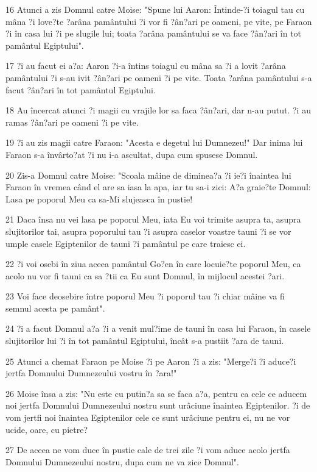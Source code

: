 \par 16 Atunci a zis Domnul catre Moise: "Spune lui Aaron: Întinde-?i toiagul tau cu mâna ?i love?te ?arâna pamântului ?i vor fi ?ân?ari pe oameni, pe vite, pe Faraon ?i în casa lui ?i pe slugile lui; toata ?arâna pamântului se va face ?ân?ari în tot pamântul Egiptului".
\par 17 ?i au facut ei a?a: Aaron ?i-a întins toiagul cu mâna sa ?i a lovit ?arâna pamântului ?i s-au ivit ?ân?ari pe oameni ?i pe vite. Toata ?arâna pamântului s-a facut ?ân?ari în tot pamântul Egiptului.
\par 18 Au încercat atunci ?i magii cu vrajile lor sa faca ?ân?ari, dar n-au putut. ?i au ramas ?ân?ari pe oameni ?i pe vite.
\par 19 ?i au zis magii catre Faraon: "Acesta e degetul lui Dumnezeu!" Dar inima lui Faraon s-a învârto?at ?i nu i-a ascultat, dupa cum spusese Domnul.
\par 20 Zis-a Domnul catre Moise: "Scoala mâine de diminea?a ?i ie?i înaintea lui Faraon în vremea când el are sa iasa la apa, iar tu sa-i zici: A?a graie?te Domnul: Lasa pe poporul Meu ca sa-Mi slujeasca în pustie!
\par 21 Daca însa nu vei lasa pe poporul Meu, iata Eu voi trimite asupra ta, asupra slujitorilor tai, asupra poporului tau ?i asupra caselor voastre tauni ?i se vor umple casele Egiptenilor de tauni ?i pamântul pe care traiesc ei.
\par 22 ?i voi osebi în ziua aceea pamântul Go?en în care locuie?te poporul Meu, ca acolo nu vor fi tauni ca sa ?tii ca Eu sunt Domnul, în mijlocul acestei ?ari.
\par 23 Voi face deosebire între poporul Meu ?i poporul tau ?i chiar mâine va fi semnul acesta pe pamânt".
\par 24 ?i a facut Domnul a?a ?i a venit mul?ime de tauni în casa lui Faraon, în casele slujitorilor lui ?i în tot pamântul Egiptului, încât s-a pustiit ?ara de tauni.
\par 25 Atunci a chemat Faraon pe Moise ?i pe Aaron ?i a zis: "Merge?i ?i aduce?i jertfa Domnului Dumnezeului vostru în ?ara!"
\par 26 Moise însa a zis: "Nu este cu putin?a sa se faca a?a, pentru ca cele ce aducem noi jertfa Domnului Dumnezeului nostru sunt urâciune înaintea Egiptenilor. ?i de vom jertfi noi înaintea Egiptenilor cele ce sunt urâciune pentru ei, nu ne vor ucide, oare, cu pietre?
\par 27 De aceea ne vom duce în pustie cale de trei zile ?i vom aduce acolo jertfa Domnului Dumnezeului nostru, dupa cum ne va zice Domnul".
